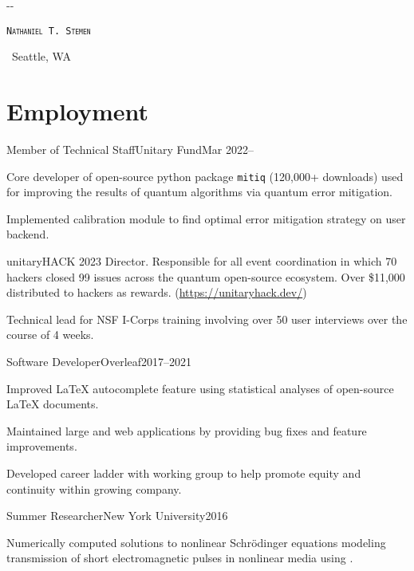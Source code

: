 \documentclass{cultvoucher}
\begin{document}
\begin{adjustwidth}{\dimexpr-\marginparsep-\marginparwidth}{}
	\begin{center}
		\textsc{\texttt{\HUGE Nathaniel T. Stemen}}

		 \separator{}\, Seattle, WA
	\end{center}
\end{adjustwidth}

\section{Employment}

\begin{entry}{Member of Technical Staff}{Unitary Fund}{Mar 2022--}
	\item Core developer of open-source python package \texttt{mitiq} (120,000+ downloads) used for improving the results of quantum algorithms via quantum error mitigation.
	\item Implemented calibration module to find optimal error mitigation strategy on user backend.
	\item unitaryHACK 2023 Director. Responsible for all event coordination in which 70 hackers closed 99 issues across the quantum open-source ecosystem. Over \$11,000 distributed to hackers as rewards. (\url{https://unitaryhack.dev/})
	\item Technical lead for NSF I-Corps training involving over 50 user interviews over the course of 4 weeks.
\end{entry}

\begin{entry}{Software Developer}{Overleaf}{2017--2021}
	\item Improved \LaTeX{} autocomplete feature using statistical analyses of open-source \LaTeX{} documents.
	\item Maintained large  and  web applications by providing bug fixes and feature improvements.
	\item Developed career ladder with working group to help promote equity and continuity within growing company.
\end{entry}

\begin{entry}{Summer Researcher}{New York University}{2016}
	\item Numerically computed solutions to nonlinear Schr\"{o}dinger equations modeling transmission of short electromagnetic pulses in nonlinear media using .
\end{entry}
\end{document}
